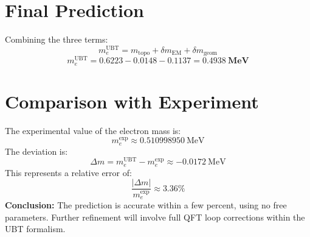 \documentclass[12pt, a4paper]{article}
\begin{document}
\section{Final Prediction}
Combining the three terms:
\[
m_e^{\text{UBT}} = m_{\text{topo}} + \delta m_{\text{EM}} + \delta m_{\text{geom}} 
\]
\[
m_e^{\text{UBT}} = 0.6223 - 0.0148 - 0.1137 = \mathbf{0.4938~\text{MeV}}
\]

\section{Comparison with Experiment}
The experimental value of the electron mass is:
\[
m_e^{\text{exp}} \approx 0.510998950~\text{MeV}
\]
The deviation is:
\[
\Delta m = m_e^{\text{UBT}} - m_e^{\text{exp}} \approx -0.0172~\text{MeV}
\]
This represents a relative error of:
\[
\frac{|\Delta m|}{m_e^{\text{exp}}} \approx 3.36\%
\]
\textbf{Conclusion:} The prediction is accurate within a few percent, using no free parameters. Further refinement will involve full QFT loop corrections within the UBT formalism.
\end{document}

